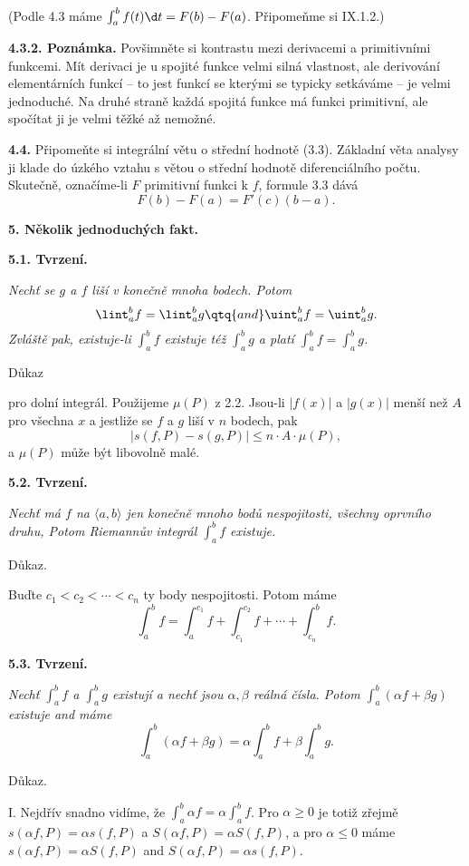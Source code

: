 \documentclass[12pt]{article}
\begin{document}
{(Podle 4.3 máme $\int_a^bf(t)\d t=F(b)-F(a)$. Připomeňme si IX.1.2.)

\medskip

{\bf 4.3.2. Poznámka.} Povšimněte si kontrastu mezi derivacemi a primitivními funkcemi. Mít derivaci je u spojité funkce velmi silná vlastnost, ale derivování elementárních funkcí -- to jest funkcí se kterými se typicky setkáváme -- je velmi jednoduché. Na druhé straně každá spojitá funkce má funkci primitivní, ale spočítat ji je velmi těžké až nemožné.

\bigskip

{\bf 4.4.} Připomeňte si integrální větu o střední hodnotě (3.3). Základní věta analysy ji klade do úzkého vztahu s větou o střední hodnotě diferenciálního počtu. Skutečně, označíme-li
$F$ primitivní funkci k $f$, formule 3.3  dává
$$
F(b)-F(a)=F'(c)(b-a).
$$

\vskip10mm
 
 {\large\bf 5. Několik jednoduchých fakt.} 
 
 \bigskip
 
 {\bf 5.1. Tvrzení.} {\em Nechť se $g$ a $f$ liší v konečně mnoha bodech. Potom
 $$
 \lint_a^bf=\lint_a^bg \qtq{and} \uint_a^bf=\uint_a^bg.
 $$
  Zvláště pak, existuje-li $\int_a^bf$ existuje též $\int_a^bg$ a platí $\int_a^bf=\int_a^bg $.
 
 Důkaz}\hskip1mm pro dolní integrál. Použijeme $\mu(P)$ z 2.2. Jsou-li $|f(x)|$ a $|g(x)|$ menší než $A$ pro všechna  $x$ a jestliže se $f$ a $g$ liší v $n$ bodech, pak
$$
|s(f,P)-s(g,P)|\leq n\cdot A\cdot\mu(P),
$$
a $\mu(P)$ může být libovolně malé. \sq

\bigskip

{\bf 5.2. Tvrzení.} {\em Nechť má $f$  na $\langle a,b\rangle$ jen konečně mnoho bodů nespojitosti, všechny oprvního druhu, Potom Riemannův integrál $\int_a^bf$ existuje.

Důkaz.} Buďte $c_1<c_2<\cdots<c_n$ ty body nespojitosti. Potom máme
$$
\int_a^b f=\int_a^{c_1}f+\int_{c_1}^{c_2}f+\cdots+\int_{c_n}^bf.
$$
\sq

\bigskip

{\bf 5.3.  Tvrzení.} {\em Nechť $\int_a^b f$ a $\int_a^b g$ existují a nechť jsou $\alpha,\beta$ reálná čísla. Potom $\int_a^b (\alpha f+\beta g)$ existuje and máme
$$
\int_a^b (\alpha f+\beta g)=\alpha\int_a^bf+\beta\int_a^b g.
$$

Důkaz.} I. Nejdřív snadno vidíme, že $\int_a^b \alpha f=\alpha\int_a^b f$. Pro $\alpha\geq 0$ je totiž zřejmě
$s(\alpha f,P)=\alpha s(f,P)$ a $S(\alpha f,P)=\alpha S(f,P)$, a pro $\alpha\leq 0$ máme
$s(\alpha f,P)=\alpha S(f,P)$ and $S(\alpha f,P)=\alpha s(f,P)$.

}
\end{document}
